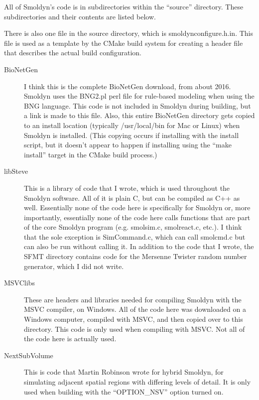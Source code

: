 \documentclass {scrbook}
\begin{document}
All of Smoldyn's code is in subdirectories within the ``source'' directory. These subdirectories and their contents are listed below.

There is also one file in the source directory, which is smoldynconfigure.h.in. This file is used as a template by the CMake build system for creating a header file that describes the actual build configuration.

\begin{description}

\item[BioNetGen] I think this is the complete BioNetGen download, from about 2016. Smoldyn uses the BNG2.pl perl file for rule-based modeling when using the BNG language. This code is not included in Smoldyn during building, but a link is made to this file. Also, this entire BioNetGen directory gets copied to an install location (typically /usr/local/bin for Mac or Linux) when Smoldyn is installed. (This copying occurs if installing with the install script, but it doesn't appear to happen if installing using the ``make install'' target in the CMake build process.)

\item[libSteve] This is a library of code that I wrote, which is used throughout the Smoldyn software. All of it is plain C, but can be compiled as C++ as well. Essentially none of the code here is specifically for Smoldyn or, more importantly, essentially none of the code here calls functions that are part of the core Smoldyn program (e.g. smolsim.c, smolreact.c, etc.). I think that the sole exception is SimCommand.c, which can call smolcmd.c but can also be run without calling it. In addition to the code that I wrote, the SFMT directory contains code for the Mersenne Twister random number generator, which I did not write.

\item[MSVClibs] These are headers and libraries needed for compiling Smoldyn with the MSVC compiler, on Windows. All of the code here was downloaded on a Windows computer, compiled with MSVC, and then copied over to this directory. This code is only used when compiling with MSVC. Not all of the code here is actually used.

\item[NextSubVolume] This is code that Martin Robinson wrote for hybrid Smoldyn, for simulating adjacent spatial regions with differing levels of detail. It is only used when building with the ``OPTION\_NSV'' option turned on.


\end{description}
\end{document}
